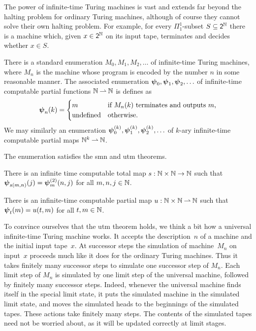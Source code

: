 The power of infinite-time Turing machines is vast and extends far beyond the halting
problem for ordinary Turing machines, although of course they cannot solve their own
halting problem. For example, for every $\Pi^1_1$-subset $S \subseteq \mathsf{2}^{\mathbb{N}}$ there is a machine which, given $x \in \mathsf{2}^{\mathbb{N}}$ on its input tape, terminates and decides whether $x \in S$.

There is a standard enumeration $M_0, M_1, M_2, \ldots$ of infinite-time Turing
machines, where $M_n$ is the machine whose program is encoded by the number $n$
in some reasonable manner. The associated enumeration $\text{\boldmath{$\psi$}}_{0}, \text{\boldmath{$\psi$}}_{1}, \text{\boldmath{$\psi$}}_{2},
\ldots$ of infinite-time computable partial functions $\mathbb{N} \mathbin{\rightharpoonup} \mathbb{N}$ is
defines as
%
\begin{equation*}
  \text{\boldmath{$\psi$}}_{n}(k) =
  \begin{cases}
    m & \text{if $M_n(k)$ terminates and outputs $m$,}\\
    \text{undefined} & \text{otherwise}.
  \end{cases}
\end{equation*}
%
We may similarly an enumeration $\text{\boldmath{$\psi$}}_{0}^{(k)}, \text{\boldmath{$\psi$}}_{1}^{(k)}, \text{\boldmath{$\psi$}}_{2}^{(k)}, \ldots$ of $k$-ary infinite-time computable partial maps $\mathbb{N}^k \mathbin{\rightharpoonup} \mathbb{N}$.

The enumeration satisfies the smn and utm theorems.

\begin{theorem}
  There is an infinite time computable total map $s : \mathbb{N} \times \mathbb{N} \to \mathbb{N}$
  such that $\text{\boldmath{$\psi$}}_{{s}(m,n)}(j) = \text{\boldmath{$\psi$}}_{m}^{(2)}(n, j)$ for all $m, n, j \in \mathbb{N}$.
\end{theorem}

\begin{theorem}
  There is an infinite-time computable partial map $u : \mathbb{N} \times \mathbb{N} \mathbin{\rightharpoonup}
  \mathbb{N}$ such that $\text{\boldmath{$\psi$}}_{t}(m) = u(t,m)$ for all $t, m \in \mathbb{N}$.
\end{theorem}

\noindent
%
To convince ourselves that the utm theorem holds, we think a bit how a universal
infinite-time Turing machine works. It accepts the description~$n$ of a machine and the
initial input tape~$x$. At successor steps the simulation of machine~$M_n$ on input~$x$
proceeds much like it does for the ordinary Turing machines. Thus it takes finitely many
successor steps to simulate one successor step of $M_n$. Each limit step of $M_n$ is
simulated by one limit step of the universal machine, followed by finitely many successor
steps. Indeed, whenever the universal machine finds itself in the special limit state, it
puts the simulated machine in the simulated limit state, and moves the simulated heads to
the beginnings of the simulated tapes. These actions take finitely many steps. The
contents of the simulated tapes need not be worried about, as it will be updated correctly at limit stages.

